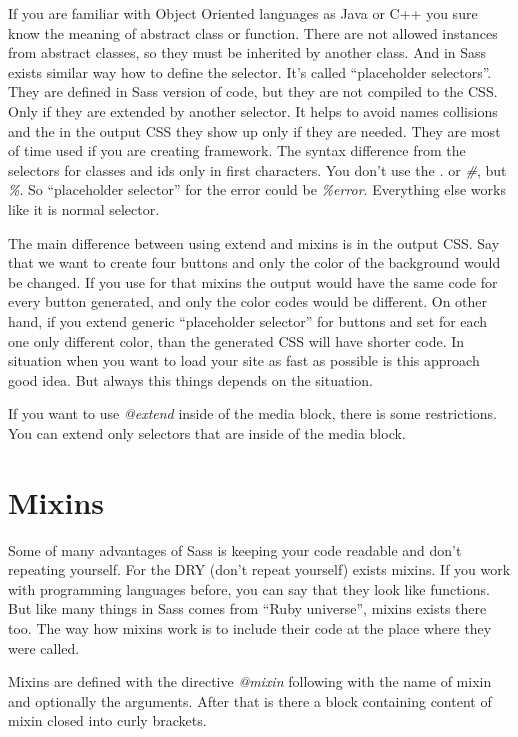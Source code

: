 \documentclass[a4paper,12pt,oneside]{sphinxmanual}
\begin{document}
If you are familiar with Object Oriented languages as Java or C++ you sure know the meaning of abstract class or function. There are not allowed instances from abstract classes, so they must be inherited by another class. And in Sass exists similar way how to define the selector. It's called ``placeholder selectors''. They are defined in Sass version of code, but they are not compiled to the CSS. Only if they are extended by another selector. It helps to avoid names collisions and the in the output CSS they show up only if they are needed. They are most of time used if you are creating framework. The syntax difference from the selectors for classes and ids only in first characters. You don't use the \emph{.} or \emph{\#}, but \emph{\%}. So ``placeholder selector'' for the error could be \emph{\%error}. Everything else works like it is normal selector.

The main difference between using extend and mixins is in the output CSS. Say that we want to create four buttons and only the color of the background would be changed. If you use for that mixins the output would have the same code for every button generated, and only the color codes would be different. On other hand, if you extend generic ``placeholder selector''  for buttons and set for each one only different color, than the generated CSS will have shorter code. In situation when you want to load your site as fast as possible is this approach good idea. But always this things depends on the situation.

If you want to use \emph{@extend} inside of the media block, there is some restrictions. You can extend only selectors that are inside of the media block.


\chapter{Mixins}
\label{src/mixins:mixins}\label{src/mixins::doc}
Some of many advantages of Sass is keeping your code readable and don't repeating yourself. For the DRY (don't repeat yourself) exists mixins. If you work with programming languages before, you can say that they look like functions. But like many things in Sass comes from ``Ruby universe'', mixins exists there too. The way how mixins work is to include their code at the place where they were called.

Mixins are defined with the directive \emph{@mixin} following with the name of mixin and optionally the arguments. After that is there a block containing content of mixin closed into curly brackets.
\end{document}
